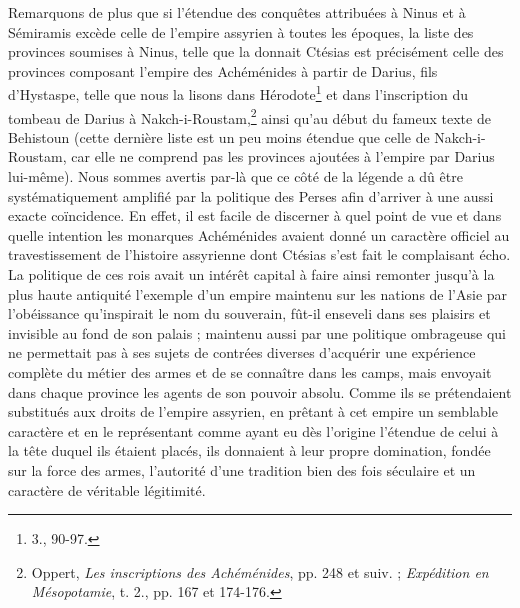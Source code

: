 \documentclass[a4paper, 11pt, oneside, landscape]{article}
\begin{document}
Remarquons de plus que si l'étendue des conquêtes attribuées à Ninus et à Sémiramis excède celle de l'empire assyrien à toutes les époques, la liste des provinces soumises à Ninus, telle que la donnait Ctésias est précisément celle des provinces composant l'empire des Achéménides à partir de Darius, fils d'Hystaspe, telle que nous la lisons dans Hérodote\footnote{3., 90-97.} et dans l'inscription du tombeau de Darius à Nakch-i-Roustam,\footnote{Oppert, \emph{Les inscriptions des Achéménides}, pp. 248 et suiv. ; \emph{Expédition en Mésopotamie}, t. 2., pp. 167 et 174-176.} ainsi qu'au début du fameux texte de Behistoun (cette dernière liste est un peu moins étendue que celle de Nakch-i-Roustam, car elle ne comprend pas les provinces ajoutées à l'empire par Darius lui-même). Nous sommes avertis par-là que ce côté de la légende a dû être systématiquement amplifié par la politique des Perses afin d'arriver à une aussi exacte coïncidence. En effet, il est facile de discerner à quel point de vue et dans quelle intention les monarques Achéménides avaient donné un caractère officiel au travestissement de l'histoire assyrienne dont Ctésias s'est fait le complaisant écho. La politique de ces rois avait un intérêt capital à faire ainsi remonter jusqu'à la plus haute antiquité l'exemple d'un empire maintenu sur les nations de l'Asie par l'obéissance qu'inspirait le nom du souverain, fût-il enseveli dans ses plaisirs et invisible au fond de son palais ; maintenu aussi par une politique ombrageuse qui ne permettait pas à ses sujets de contrées diverses d'acquérir une expérience complète du métier des armes et de se connaître dans les camps, mais envoyait dans chaque province les agents de son pouvoir absolu. Comme ils se prétendaient substitués aux droits de l'empire assyrien, en prêtant à cet empire un semblable caractère et en le représentant comme ayant eu dès l'origine l'étendue de celui à la tête duquel ils étaient placés, ils donnaient à leur propre domination, fondée sur la force des armes, l'autorité d'une tradition bien des fois séculaire et un caractère de véritable légitimité.
\end{document}
